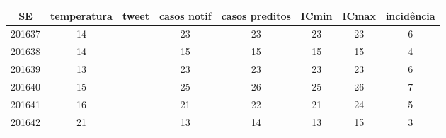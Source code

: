 \begin{tabular}{c|ccccccc}
  \hline
SE & temperatura & tweet & casos notif & casos preditos & ICmin & ICmax & incidência \\ 
  \hline
201637 & 14 &  & 23 & 23 & 23 & 23 & 6 \\ 
  201638 & 14 &  & 15 & 15 & 15 & 15 & 4 \\ 
  201639 & 13 &  & 23 & 23 & 23 & 23 & 6 \\ 
  201640 & 15 &  & 25 & 26 & 25 & 26 & 7 \\ 
  201641 & 16 &  & 21 & 22 & 21 & 24 & 5 \\ 
  201642 & 21 &  & 13 & 14 & 13 & 15 & 3 \\ 
   \hline
\end{tabular}
